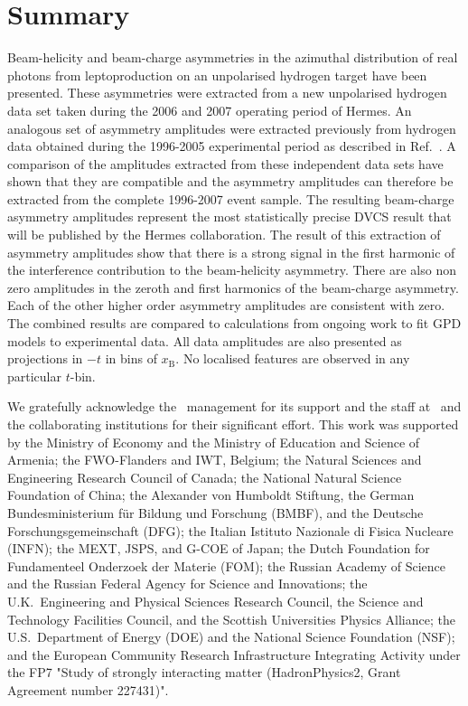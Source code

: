 \section{Summary}

Beam-helicity and beam-charge asymmetries in the azimuthal distribution of real photons from leptoproduction on an unpolarised hydrogen target have been presented. These asymmetries were extracted from a new unpolarised hydrogen data set taken during the 2006 and 2007 operating period of H{\sc ermes}. An analogous set of asymmetry amplitudes were extracted previously from hydrogen data obtained during the 1996-2005 experimental period as described in Ref.~\cite{Air09}. A comparison of the amplitudes extracted from these independent data sets have shown that they are compatible and the asymmetry amplitudes can therefore be extracted from the complete 1996-2007 event sample. The resulting beam-charge asymmetry amplitudes represent the most statistically precise DVCS result that will be published by the H{\sc ermes} collaboration. The result of this extraction of asymmetry amplitudes show that there is a strong signal in the first harmonic of the interference contribution to the beam-helicity asymmetry. There are also non zero amplitudes in the zeroth and first harmonics of the beam-charge asymmetry. Each of the other higher order asymmetry amplitudes are consistent with zero. The combined results are compared to calculations from ongoing work to fit GPD models to experimental data. All data amplitudes are also presented as projections in $-t$ in bins of $x_{\textrm{B}}$. No localised features are observed in any particular $t$-bin.

\acknowledgments
We gratefully acknowledge the \desy\ management for its support and the staff
at \desy\ and the collaborating institutions for their significant effort.
This work was supported by 
the Ministry of Economy and the Ministry of Education and Science of Armenia;
the FWO-Flanders and IWT, Belgium;
the Natural Sciences and Engineering Research Council of Canada;
the National Natural Science Foundation of China;
the Alexander von Humboldt Stiftung,
the German Bundesministerium f\"ur Bildung und Forschung (BMBF), and
the Deutsche Forschungsgemeinschaft (DFG);
the Italian Istituto Nazionale di Fisica Nucleare (INFN);
the MEXT, JSPS, and G-COE of Japan;
the Dutch Foundation for Fundamenteel Onderzoek der Materie (FOM);
the Russian Academy of Science and the Russian Federal Agency for 
Science and Innovations;
the U.K.~Engineering and Physical Sciences Research Council, 
the Science and Technology Facilities Council,
and the Scottish Universities Physics Alliance;
the U.S.~Department of Energy (DOE) and the National Science Foundation (NSF);
and the European Community Research Infrastructure Integrating Activity
under the FP7 "Study of strongly interacting matter (HadronPhysics2, Grant
Agreement number 227431)".

